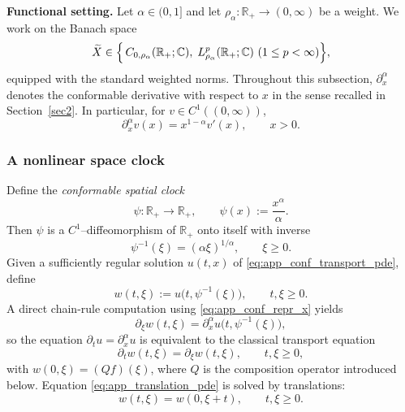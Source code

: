 \documentclass[preprint,12pt]{elsarticle}
\newcommand{\R}{\mathbb {R}}
\newcommand{\C}{\mathbb {C}}
\begin{document}
\medskip
\noindent\textbf{Functional setting.}
Let $\alpha\in(0,1]$ and let $\rho_\alpha:\R_+\to(0,\infty)$ be a weight.
We work on the Banach space
\[
\widetilde X \in \Bigl\{\, C_{0,\rho_\alpha}(\R_+;\C),\; L^p_{\rho_\alpha}(\R_+;\C)\ (1\le p<\infty)\Bigr\},
\]
equipped with the standard weighted norms.
Throughout this subsection, $\partial_x^\alpha$ denotes the conformable derivative with respect
to $x$ in the sense recalled in Section~\ref{sec2}. In particular, for $v\in C^1((0,\infty))$,
\begin{equation}\label{eq:app_conf_repr_x}
\partial_x^\alpha v(x)=x^{1-\alpha}v'(x),\qquad x>0.
\end{equation}

\subsubsection*{A nonlinear space clock}

Define the \emph{conformable spatial clock}
\begin{equation}\label{eq:app_space_clock}
\psi:\R_+\to\R_+,\qquad \psi(x):=\frac{x^\alpha}{\alpha}.
\end{equation}
Then $\psi$ is a $C^1$--diffeomorphism of $\R_+$ onto itself with inverse
\[
\psi^{-1}(\xi)=(\alpha\xi)^{1/\alpha},\qquad \xi\ge0.
\]
Given a sufficiently regular solution $u(t,x)$ of \eqref{eq:app_conf_transport_pde}, define
\begin{equation}\label{eq:app_w_def}
w(t,\xi):=u\bigl(t,\psi^{-1}(\xi)\bigr),\qquad t,\xi\ge0.
\end{equation}
A direct chain-rule computation using \eqref{eq:app_conf_repr_x} yields
\[
\partial_\xi w(t,\xi)=\partial_x^\alpha u\bigl(t,\psi^{-1}(\xi)\bigr),
\]
so the equation $\partial_t u=\partial_x^\alpha u$ is equivalent to the classical
transport equation
\begin{equation}\label{eq:app_translation_pde}
\partial_t w(t,\xi)=\partial_\xi w(t,\xi),\qquad t,\xi\ge0,
\end{equation}
with $w(0,\xi)=(Qf)(\xi)$, where $Q$ is the composition operator introduced below.
Equation \eqref{eq:app_translation_pde} is solved by translations:
\begin{equation}\label{eq:app_translation_solution}
w(t,\xi)=w(0,\xi+t),\qquad t,\xi\ge0.
\end{equation}

\end{document}
